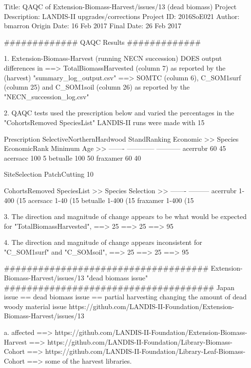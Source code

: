 Title:				QAQC of Extension-Biomass-Harvest/issues/13  (dead biomass)
Project Description:		LANDIS-II upgrades/corrections
Project ID:			2016SoE021
Author:				bmarron
Origin Date:			16 Feb 2017
Final Date:			26 Feb 2017


#############
QAQC Results
#############

	1. Extension-Biomass-Harvest (running NECN succession) DOES output differences in
		==> TotalBiomassHarvested (column 7) as reported by the (harvest) 
		    "summary_log_output.csv"
		==> SOMTC (column 6), C_SOM1surf (column 25) and C_SOM1soil (column 26) as 
	            reported by the "NECN_succession_log.csv"


	2. QAQC tests used the prescription below and varied the percentages in the 
	   "CohortsRemoved SpeciesList" LANDIS-II runs were made with 15%

Prescription SelectiveNorthernHardwood
    StandRanking    Economic
>>	Species 	EconomicRank	 Minimum Age
>>	------- 	------------ 	-----------
    	acerrubr   	60 	     	45
    	acersacc   	100          	5
    	betualle   	100	     	50
    	fraxamer   	60	     	40

    SiteSelection PatchCutting 10%

    CohortsRemoved SpeciesList
>>	Species		Selection
>>	-------		---------
	acerrubr   	1-400 (15%
	acersacc   	1-40 (15%
	betualle   	1-400 (15%
	fraxamer   	1-400 (15%


	3. The direction and magnitude of change appears to be what would be expected for 
	   "TotalBiomassHarvested",
		==> 25%
		==> 25%
		==> 95%

	4. The direction and magnitude of change appears inconsistent for "C_SOM1surf" and 
	   "C_SOMsoil", 
		==> 25%
		==> 25%
		==> 95%







####################################
Extension-Biomass-Harvest/issues/13
"dead biomass issue"
#####################################
Japan issue == dead biomass issue == partial harvesting changing the amount of dead 
woody material issue
https://github.com/LANDIS-II-Foundation/Extension-Biomass-Harvest/issues/13

	a. affected
		==> https://github.com/LANDIS-II-Foundation/Extension-Biomass-Harvest
		==> https://github.com/LANDIS-II-Foundation/Library-Biomass-Cohort
		==> https://github.com/LANDIS-II-Foundation/Library-Leaf-Biomass-Cohort
		==> some of the harvest libraries. 

